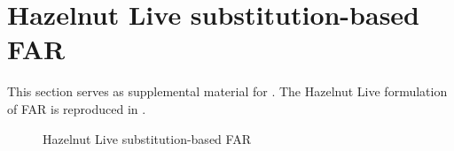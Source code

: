 \section{Hazelnut Live substitution-based FAR}
\label{sec:far-substitution}

This section serves as supplemental material for . The Hazelnut Live formulation of FAR is reproduced in .

\begin{figure}
  \centering
  \begin{mdframed}
    \begin{singlespace}
      
    \end{singlespace}
  \end{mdframed}
  \caption{Hazelnut Live substitution-based FAR}
  \label{fig:far-substitution}
\end{figure}



